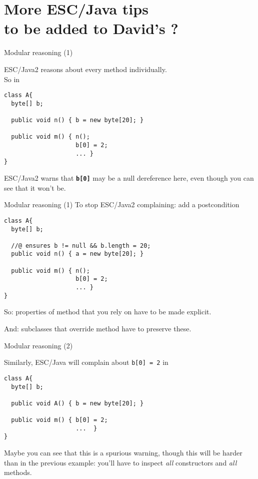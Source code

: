 \documentclass[
pdf,
nocolorBG,
slideColor,
erik,
]{prosper}
\newcommand{\code}[1]{{\rm \texttt{\textbf{\small #1}}}}
\begin{document}
\part{{\Large \red More ESC/Java tips \\ to be added to David's ?}}


\begin{slide}{Modular reasoning (1)}
\vspace*{-3ex}

ESC/Java2 reasons about every method individually.\\
So in

\begin{verbatim}
class A{
  byte[] b;

  public void n() { b = new byte[20]; }

  public void m() { n();
                    b[0] = 2;
                    ... }
}
\end{verbatim}

ESC/Java2 warns that \code{b[0]} may be a null dereference here,
even though you can see that it won't be.
\end{slide}

\begin{slide}{Modular reasoning (1)}
\vspace*{-3ex}
To stop ESC/Java2 complaining: add a postcondition


\begin{verbatim}
class A{
  byte[] b;

  //@ ensures b != null && b.length = 20;
  public void n() { a = new byte[20]; }

  public void m() { n();
                    b[0] = 2;
                    ... }
}
\end{verbatim}
So: properties of method that you rely on have to be made explicit.

And: subclasses that override method have to preserve these.

\end{slide}

\begin{slide}{Modular reasoning (2)}
\vspace*{-3ex}

Similarly, ESC/Java will complain about {\tt b[0] = 2} in

\begin{verbatim}
class A{
  byte[] b;

  public void A() { b = new byte[20]; }

  public void m() { b[0] = 2;
                    ...  }
}
\end{verbatim}
Maybe you can see that this is a spurious warning,
though this will be harder than in the previous example:
you'll have to inspect {\em all} constructors and {\em all} methods.

\end{slide}
\end{document}
